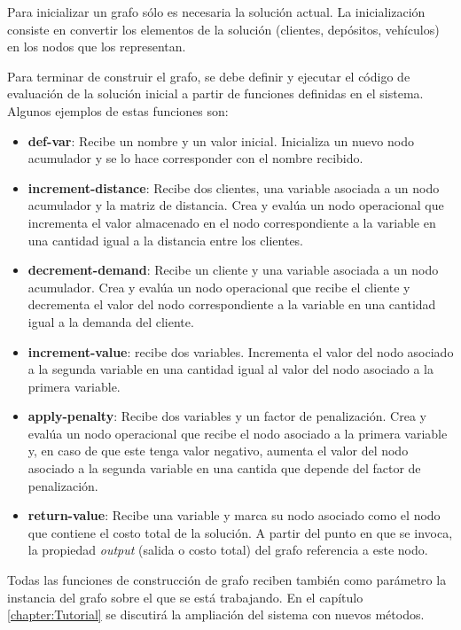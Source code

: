 Para inicializar un grafo sólo es necesaria la solución actual. La inicialización consiste en convertir los elementos de la solución (clientes, depósitos, vehículos) en los nodos que los representan.

Para terminar de construir el grafo, se debe definir y ejecutar el código de evaluación de la solución inicial a partir de funciones definidas en el sistema. Algunos ejemplos de estas funciones son:

\begin{itemize}
	\item \textbf{def-var}: Recibe un nombre y un valor inicial. Inicializa un nuevo nodo acumulador y se lo hace corresponder con el nombre recibido.	
	\item \textbf{increment-distance}: Recibe dos clientes, una variable asociada a un nodo acumulador y la matriz de distancia. Crea y evalúa un nodo operacional que incrementa el valor almacenado en el nodo correspondiente a la variable en una cantidad igual a la distancia entre los clientes.
	\item \textbf{decrement-demand}: Recibe un cliente y una variable asociada a un nodo acumulador. Crea y evalúa un nodo operacional que recibe el cliente y decrementa el valor del nodo correspondiente a la variable en una cantidad igual a la demanda del cliente.
	\item \textbf{increment-value}: recibe dos variables. Incrementa el valor del nodo asociado a la segunda variable en una cantidad igual al valor del nodo asociado a la primera variable.
	\item \textbf{apply-penalty}: Recibe dos variables y un factor de penalización. Crea y evalúa un nodo operacional que recibe el nodo asociado a la primera variable y, en caso de que este tenga valor negativo, aumenta el valor del nodo asociado a la segunda variable en una cantida que depende del factor de penalización.
	\item \textbf{return-value}: Recibe una variable y marca su nodo asociado como el nodo que contiene el costo total de la solución. A partir del punto en que se invoca, la propiedad \textit{output} (salida o costo total) del grafo referencia a este nodo.
\end{itemize}

Todas las funciones de construcción de grafo reciben también como parámetro la instancia del grafo sobre el que se está trabajando. En el capítulo \ref{chapter:Tutorial} se discutirá la ampliación del sistema con nuevos métodos. 

